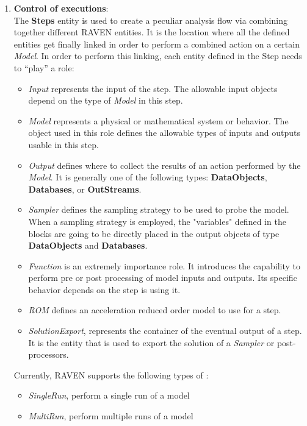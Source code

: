 \begin{enumerate}
    \item \textbf{Control of executions}: 
      \\The \textbf{Steps} entity is used to create a peculiar analysis flow via combining together different RAVEN
      entities. It is the location where all the defined entities get finally linked in order to perform a combined
      action on a certain \textit{Model}. In order to perform this linking, each entity defined in the Step needs to
      ``play'' a role:
      \begin{itemize}
        \item \textit{Input} represents the input of the step. The allowable input objects depend on the type
          of \textit{Model} in this step.
        \item \textit{Model} represents a physical or mathematical system or behavior. The object used in this role
          defines the allowable types of inputs and outputs usable in this step.
        \item \textit{Output} defines where to collect the results of an action performed by the \textit{Model}. It
          is generally one of the following types: \textbf{DataObjects}, \textbf{Databases}, or \textbf{OutStreams}.
        \item \textit{Sampler} defines the sampling strategy to be used to probe the model. \nb When a sampling
          strategy is employed, the "variables" defined in the  blocks are going to be directly
          placed in the output objects of type \textbf{DataObjects} and \textbf{Databases}.
        \item \textit{Function} is an extremely importance role. It introduces the capability to perform pre or post
          processing of model inputs and outputs. Its specific behavior depends on the step is using it.
        \item \textit{ROM} defines an acceleration reduced order model to use for a step.
        \item \textit{SolutionExport}, represents the container of the eventual output of a step. It is the entity
          that is used to export the solution of a \textit{Sampler} or post-processors.
      \end{itemize}
      Currently, RAVEN supports the following types of \textit{}:
      \begin{itemize}
        \item \textit{SingleRun}, perform a single run of a model
        \item \textit{MultiRun}, perform multiple runs of a model

\end{itemize}
\end{enumerate}
